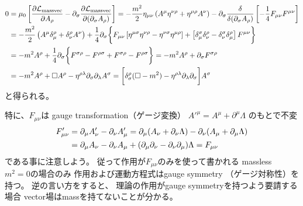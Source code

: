 \begin{subequations}
\begin{align}
    0
	&=
	\mu_0
\left[
    \dfrac{\partial \mathcal{L}_{\rm massvec}}
        {\partial A_\rho}
	-
    \partial_\sigma
    \dfrac{\partial \mathcal{L}_{\rm massvec}}
		{\partial (\partial_\sigma A_\rho)}
\right]
    =
    -
    \dfrac{m^2}{2}
        \eta_{\mu \nu}
        \left(
            A^\mu \eta^{\nu\rho}
        +
            \eta^{\mu\rho} A^\nu
        \right)
    -
    \partial_\sigma
    \dfrac{\delta}
        {\delta (\partial_\sigma A_\rho)}
        \left[
            - \dfrac{1}{4}
            F_{\mu\nu} F^{\mu\nu}
        \right]
\notag\\&
    =
    -
    \dfrac{m^2}{2}
        \left(
            A^\mu \delta_\mu^{\rho}
        +
            \delta_{\nu}^\rho A^\nu
        \right)
    +
    \dfrac{1}{4}
    \partial_\sigma
    \bigg\{
        F_{\mu\nu}
        \left[
            \eta^{\mu \sigma}
            \eta^{\nu \rho}
        -
            \eta^{\nu\sigma}
            \eta^{\mu \rho}
        \right]
    +
        \left[
            \delta_\mu^\sigma
            \delta_\nu^\rho
            -
            \delta_\nu^\sigma
            \delta_\mu^\rho        
        \right]
        F^{\mu\nu}
    \bigg\}
\notag\\&
    =
    -
    m^2
    A^\rho
    +
    \dfrac{1}{4}
    \partial_\sigma
    \bigg\{
        F^{\sigma\rho}
    -
        F^{\rho\sigma}
    +
        F^{\sigma\rho}
    -
        F^{\rho\sigma}
    \bigg\}
=
    -
    m^2
    A^\rho
    +
    \partial_\sigma
        F^{\sigma\rho}
\\&
=
    -
    m^2
    A^\rho
    +
    \Box A^\rho
    -
    \eta^{\rho \lambda}
    \partial_\sigma \partial_\lambda
    A^\sigma
=
    \bigg[
        \delta^\rho_\sigma
        (\Box - m^2)
    -
        \eta^{\rho \lambda}
        \partial_\lambda
        \partial_\sigma
    \bigg]
    A^\sigma
\label{free massive vector field EL eq}
\end{align}
\end{subequations}
と得られる。

特に、$F_{\mu\nu}$は
gauge transformation（ゲージ変換）
$A'^\mu = A^\mu + \partial^\mu \Lambda$
のもとで不変
\begin{align}
    F'_{\mu\nu}
&=
    \partial_\mu A'_\nu
    -
    \partial_\nu A'_\mu
=
    \partial_\mu (A_\nu + \partial_\nu \Lambda)
    -
    \partial_\nu (A_\mu + \partial_\mu \Lambda)
\notag\\&
=
    \partial_\mu A_\nu
    -
    \partial_\nu A_\mu
    + (
        \partial_\mu \partial_\nu
    -
        \partial_\nu \partial_\mu
    )\Lambda
=
    F_{\mu\nu}
\label{gauge invariance of vector field strength}
\end{align}
である事に注意しよう。
従って作用が$F_{\mu\nu}$のみを使って書かれる
massless $m^2 = 0$の場合のみ
作用および運動方程式はgauge symmetry
（ゲージ対称性）を持つ。
逆の言い方をすると、
理論の作用がgauge symmetryを持つよう要請する場合
vector場はmassを持てないことが分かる。

